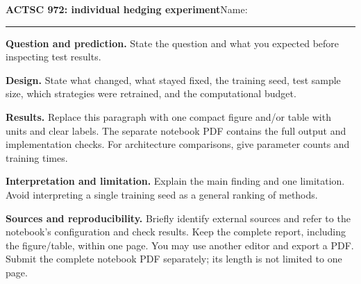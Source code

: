 \documentclass[11pt]{article}
\begin{document}
{\large\bfseries ACTSC 972: individual hedging experiment}\hfill Name: \rule{3.5cm}{0.4pt}

\textbf{Question and prediction.}
State the question and what you expected before inspecting test results.

\textbf{Design.}
State what changed, what stayed fixed, the training seed, test sample size,
which strategies were retrained, and the computational budget.

\textbf{Results.}
Replace this paragraph with one compact figure and/or table with units and
clear labels. The separate notebook PDF contains the full output and implementation checks.
For architecture comparisons, give parameter counts and training times.

\textbf{Interpretation and limitation.}
Explain the main finding and one limitation. Avoid interpreting a single
training seed as a general ranking of methods.

\textbf{Sources and reproducibility.}
Briefly identify external sources and refer to the notebook's
configuration and check results. Keep the complete report, including the
figure/table, within one page. You may use another editor and export a PDF.
Submit the complete notebook PDF separately; its length is not limited to one page.
\end{document}
